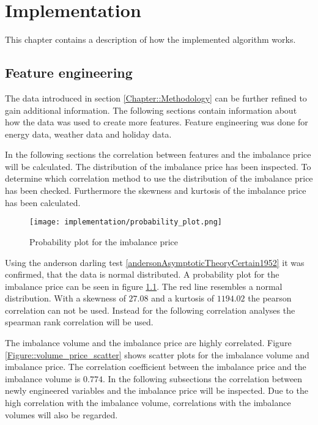 \documentclass[class=scrbook, crop=false]{standalone}
\begin{document}
\chapter{Implementation} %
\label{Chapter::Implementation}
    This chapter contains a description of how the implemented algorithm works.

\section{Feature engineering}
\label{Section::Feature_engineering}

The data introduced in section \ref{Chapter::Methodology} can be further refined to gain additional information. 
The following sections contain information about how the data was used to create more features.
Feature engineering was done for energy data, weather data and holiday data.

In the following sections the correlation between features and the imbalance price will be calculated.
The distribution of the imbalance price has been inspected. 
To determine which correlation method to use the distribution of the imbalance price has been checked.
Furthermore the skewness and kurtosis of the imbalance price has been calculated.

\begin{figure}[ht]
            \centering
            \texttt{[image: implementation/probability\_plot.png]}
            \caption[Probability plot for the imbalance price]{Probability plot for the imbalance price}
            \label{fig::rebap_distribution}
 \end{figure}

Using the anderson darling test \ref{andersonAsymptoticTheoryCertain1952} it was confirmed, that the data is normal distributed.
A probability plot for the imbalance price can be seen in figure \ref{fig::rebap_distribution}. 
The red line resembles a normal distribution. 
With a skewness of $27.08$ and a kurtosis of $1194.02$ the pearson correlation can not be used.
Instead for the following correlation analyses the spearman rank correlation will be used.

The imbalance volume and the imbalance price are highly correlated. 
Figure \ref{Figure::volume_price_scatter} shows scatter plots for the imbalance volume and imbalance price.
The correlation coefficient between the imbalance price and the imbalance volume is $0.774$.
In the following subsections the correlation between newly engineered variables and the imbalance price will be inspected.
Due to the high correlation with the imbalance volume, correlations with the imbalance volumes will also be regarded.
\end{document}
